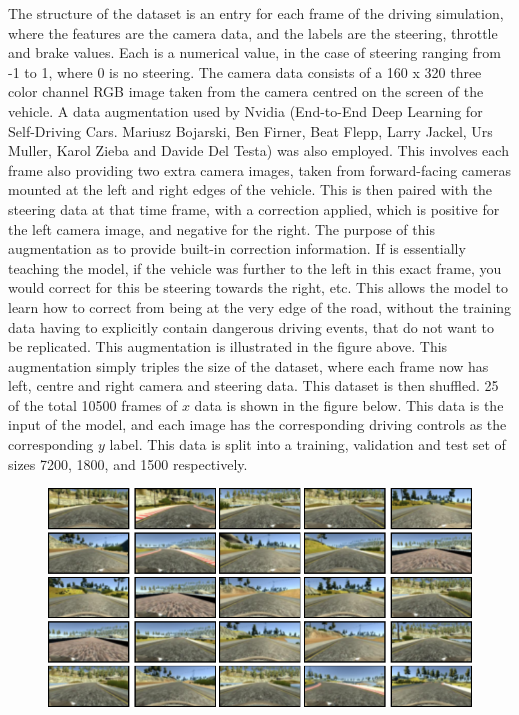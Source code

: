 \documentclass[letterpaper,12pt]{article}
\begin{document}
\FloatBarrier
The structure of the dataset is an entry for each frame of the driving simulation, where the features are the camera data, and the labels are the steering, throttle and brake values. Each is a numerical value, in the case of steering ranging from -1 to 1, where 0 is no steering. The camera data consists of a 160 x 320 three color channel RGB image taken from the camera centred on the screen of the vehicle. A data augmentation used by Nvidia (End-to-End Deep Learning for Self-Driving Cars. Mariusz Bojarski, Ben Firner, Beat Flepp, Larry Jackel, Urs Muller, Karol Zieba and Davide Del Testa) was also employed. This involves each frame also providing two extra camera images, taken from forward-facing cameras mounted at the left and right edges of the vehicle. This is then paired with the steering data at that time frame, with a correction applied, which is positive for the left camera image, and negative for the right. The purpose of this augmentation as to provide built-in correction information. If is essentially teaching the model, if the vehicle was further to the left in this exact frame, you would correct for this be steering towards the right, etc. This allows the model to learn how to correct from being at the very edge of the road, without the training data having to explicitly contain dangerous driving events, that do not want to be replicated. This augmentation is illustrated in the figure above. This augmentation simply triples the size of the dataset, where each frame now has left, centre and right camera and steering data. This dataset is then shuffled. 25 of the total 10500 frames of $x$ data is shown in the figure below. This data is the input of the model, and each image has the corresponding driving controls as the corresponding $y$ label. This data is split into a training, validation and test set of sizes 7200, 1800, and 1500 respectively. 
\FloatBarrier
\begin{figure}
\centering
\includegraphics[scale=1.5]{results/preproc_clean.pdf}
\end{figure}
\FloatBarrier
\end{document}
